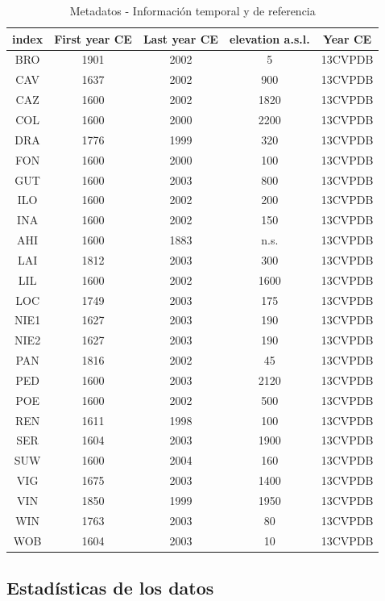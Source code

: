 \documentclass[a4paper,11pt]{article}
\begin{document}
\begin{table}[ht]
	\centering
	\caption{Metadatos - Información temporal y de referencia}
	\label{tab:metadatos2}
	\begin{tabular}{|c|c|c|c|c|}
		\hline
		index & First year CE & Last year CE & elevation a.s.l. & Year CE \\
		\hline
		BRO & 1901 & 2002 & 5 & 13CVPDB \\
		CAV & 1637 & 2002 & 900 & 13CVPDB \\
		CAZ & 1600 & 2002 & 1820 & 13CVPDB \\
		COL & 1600 & 2000 & 2200 & 13CVPDB \\
		DRA & 1776 & 1999 & 320 & 13CVPDB \\
		FON & 1600 & 2000 & 100 & 13CVPDB \\
		GUT & 1600 & 2003 & 800 & 13CVPDB \\
		ILO & 1600 & 2002 & 200 & 13CVPDB \\
		INA & 1600 & 2002 & 150 & 13CVPDB \\
		AHI & 1600 & 1883 & n.s. & 13CVPDB \\
		LAI & 1812 & 2003 & 300 & 13CVPDB \\
		LIL & 1600 & 2002 & 1600 & 13CVPDB \\
		LOC & 1749 & 2003 & 175 & 13CVPDB \\
		NIE1 & 1627 & 2003 & 190 & 13CVPDB \\
		NIE2 & 1627 & 2003 & 190 & 13CVPDB \\
		PAN & 1816 & 2002 & 45 & 13CVPDB \\
		PED & 1600 & 2003 & 2120 & 13CVPDB \\
		POE & 1600 & 2002 & 500 & 13CVPDB \\
		REN & 1611 & 1998 & 100 & 13CVPDB \\
		SER & 1604 & 2003 & 1900 & 13CVPDB \\
		SUW & 1600 & 2004 & 160 & 13CVPDB \\
		VIG & 1675 & 2003 & 1400 & 13CVPDB \\
		VIN & 1850 & 1999 & 1950 & 13CVPDB \\
		WIN & 1763 & 2003 & 80 & 13CVPDB \\
		WOB & 1604 & 2003 & 10 & 13CVPDB \\
		\hline
	\end{tabular}
\end{table}


\subsection*{Estadísticas de los datos}
\end{document}
